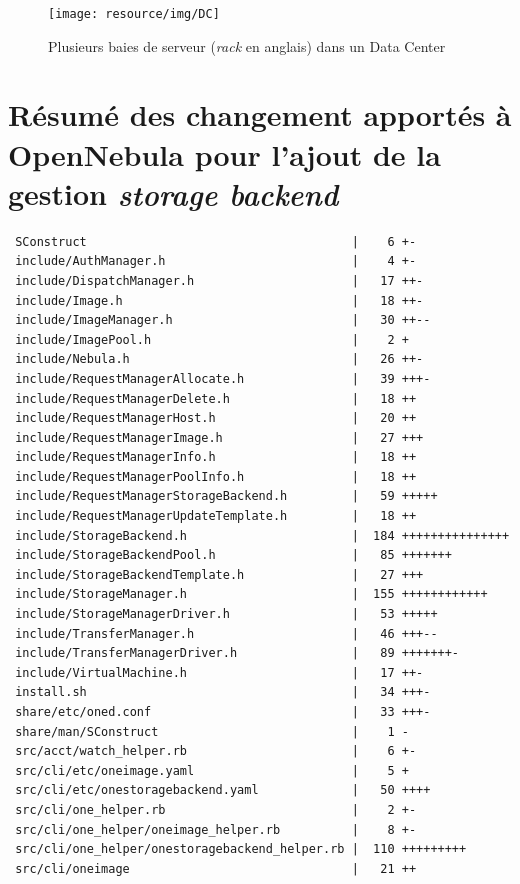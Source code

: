 \begin{figure}[H]
	\centering
	\texttt{[image: resource/img/DC]}
	\caption{Plusieurs baies de serveur (\emph{rack} en anglais) dans un Data Center}
	\label{datacenter}
\end{figure}

\chapter{Résumé des changement apportés à OpenNebula pour l'ajout de la gestion \emph{storage backend}}
\label{modopennebula}
\begin{lstlisting}
 SConstruct                                     |    6 +-
 include/AuthManager.h                          |    4 +-
 include/DispatchManager.h                      |   17 ++-
 include/Image.h                                |   18 ++-
 include/ImageManager.h                         |   30 ++--
 include/ImagePool.h                            |    2 +
 include/Nebula.h                               |   26 ++-
 include/RequestManagerAllocate.h               |   39 +++-
 include/RequestManagerDelete.h                 |   18 ++
 include/RequestManagerHost.h                   |   20 ++
 include/RequestManagerImage.h                  |   27 +++
 include/RequestManagerInfo.h                   |   18 ++
 include/RequestManagerPoolInfo.h               |   18 ++
 include/RequestManagerStorageBackend.h         |   59 +++++
 include/RequestManagerUpdateTemplate.h         |   18 ++
 include/StorageBackend.h                       |  184 +++++++++++++++
 include/StorageBackendPool.h                   |   85 +++++++
 include/StorageBackendTemplate.h               |   27 +++
 include/StorageManager.h                       |  155 ++++++++++++
 include/StorageManagerDriver.h                 |   53 +++++
 include/TransferManager.h                      |   46 +++--
 include/TransferManagerDriver.h                |   89 +++++++-
 include/VirtualMachine.h                       |   17 ++-
 install.sh                                     |   34 +++-
 share/etc/oned.conf                            |   33 +++-
 share/man/SConstruct                           |    1 -
 src/acct/watch_helper.rb                       |    6 +-
 src/cli/etc/oneimage.yaml                      |    5 +
 src/cli/etc/onestoragebackend.yaml             |   50 ++++
 src/cli/one_helper.rb                          |    2 +-
 src/cli/one_helper/oneimage_helper.rb          |    8 +-
 src/cli/one_helper/onestoragebackend_helper.rb |  110 +++++++++
 src/cli/oneimage                               |   21 ++

\end{lstlisting}
